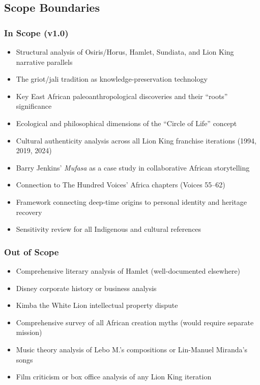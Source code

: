 \documentclass[11pt,letterpaper]{article}
\begin{document}
\subsection{Scope Boundaries}

\subsubsection*{In Scope (v1.0)}

\begin{itemize}[leftmargin=2em]
  \item Structural analysis of Osiris/Horus, Hamlet, Sundiata, and Lion King narrative parallels
  \item The griot/jali tradition as knowledge-preservation technology
  \item Key East African paleoanthropological discoveries and their ``roots'' significance
  \item Ecological and philosophical dimensions of the ``Circle of Life'' concept
  \item Cultural authenticity analysis across all Lion King franchise iterations (1994, 2019, 2024)
  \item Barry Jenkins' \textit{Mufasa} as a case study in collaborative African storytelling
  \item Connection to The Hundred Voices' Africa chapters (Voices 55--62)
  \item Framework connecting deep-time origins to personal identity and heritage recovery
  \item Sensitivity review for all Indigenous and cultural references
\end{itemize}

\subsubsection*{Out of Scope}

\begin{itemize}[leftmargin=2em]
  \item Comprehensive literary analysis of Hamlet (well-documented elsewhere)
  \item Disney corporate history or business analysis
  \item Kimba the White Lion intellectual property dispute
  \item Comprehensive survey of all African creation myths (would require separate mission)
  \item Music theory analysis of Lebo M.'s compositions or Lin-Manuel Miranda's songs
  \item Film criticism or box office analysis of any Lion King iteration
\end{itemize}
\end{document}
